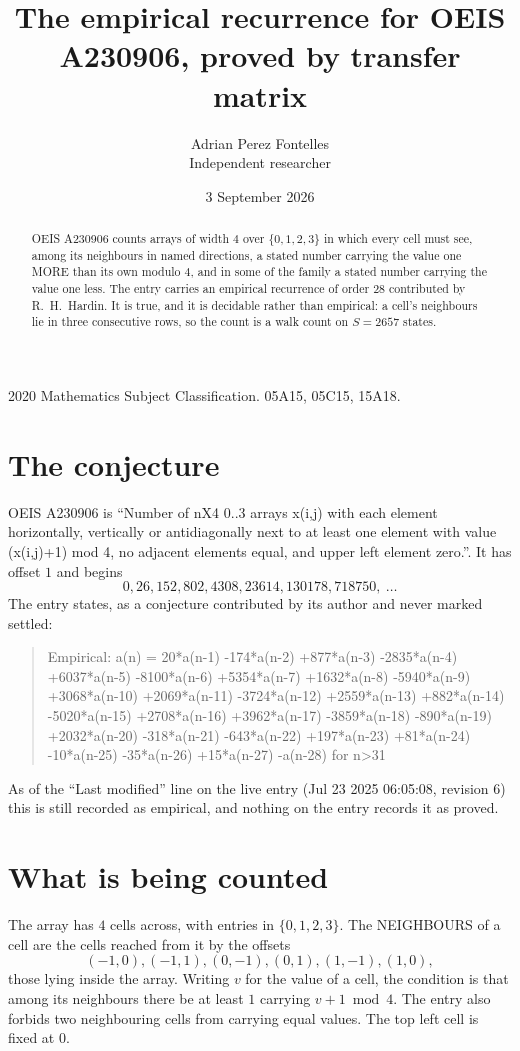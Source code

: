 \documentclass[11pt,a4paper]{article}
\title{The empirical recurrence for OEIS A230906, proved by transfer matrix}
\author{Adrian Perez Fontelles\\ \small Independent researcher}
\date{3 September 2026}
\theoremstyle{plain}
\theoremstyle{definition}
\begin{document}
\maketitle

\begin{abstract}
OEIS A230906 counts arrays of width $4$ over $\{0,1,2,3\}$ in which every cell must see, among its
neighbours in named directions, a stated number carrying the value one MORE than its own
modulo $4$, and in some of the family a stated number carrying the value one less. The entry
carries an empirical recurrence of order $28$ contributed by R.~H.~Hardin. It is true, and
it is decidable rather than empirical: a cell's neighbours lie in three consecutive rows, so
the count is a walk count on $S=2657$ states.
\end{abstract}

\noindent\small 2020 Mathematics Subject Classification. 05A15, 05C15, 15A18.\normalsize

\section{The conjecture}

OEIS A230906 is ``Number of nX4 0..3 arrays x(i,j) with each element horizontally, vertically or antidiagonally next to at least one element with value (x(i,j)+1) mod 4, no adjacent elements equal, and upper left element zero.''. It has offset $1$ and begins
\[
0, 26, 152, 802, 4308, 23614, 130178, 718750,\ \dots
\]
The entry states, as a conjecture contributed by its author and never marked settled:
\begin{quote}
Empirical: a(n) = 20*a(n-1) -174*a(n-2) +877*a(n-3) -2835*a(n-4) +6037*a(n-5) -8100*a(n-6) +5354*a(n-7) +1632*a(n-8) -5940*a(n-9) +3068*a(n-10) +2069*a(n-11) -3724*a(n-12) +2559*a(n-13) +882*a(n-14) -5020*a(n-15) +2708*a(n-16) +3962*a(n-17) -3859*a(n-18) -890*a(n-19) +2032*a(n-20) -318*a(n-21) -643*a(n-22) +197*a(n-23) +81*a(n-24) -10*a(n-25) -35*a(n-26) +15*a(n-27) -a(n-28) for n>31
\end{quote}
As of the ``Last modified'' line on the live entry (Jul 23 2025 06:05:08, revision 6) this is still
recorded as empirical, and nothing on the entry records it as proved.

\section{What is being counted}

The array has $4$ cells across, with entries in $\{0,1,2,3\}$. The NEIGHBOURS of a cell are the
cells reached from it by the offsets
\[
(-1,0), (-1,1), (0,-1), (0,1), (1,-1), (1,0),
\]
those lying inside the array. Writing $v$ for the value of a cell, the condition is that among
its neighbours there be at least $1$ carrying $v+1 \bmod 4$. The entry also forbids two neighbouring cells from carrying equal values. The top left
cell is fixed at $0$.
\end{document}
